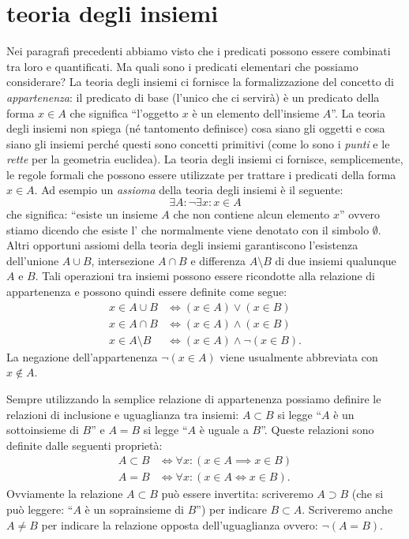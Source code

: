 \section{teoria degli insiemi}
Nei paragrafi precedenti abbiamo visto che i predicati possono essere
combinati tra loro e quantificati.
Ma quali sono i predicati elementari che possiamo considerare?
La teoria degli insiemi ci fornisce la formalizzazione del concetto
di \emph{appartenenza}: il predicato di base (l'unico che ci servirà) è
un predicato della forma $x \in A$ che significa ``l'oggetto $x$ è un elemento
dell'insieme $A$''.
La teoria degli insiemi non spiega (né tantomento definisce)
cosa siano gli oggetti e cosa siano gli insiemi perché questi sono concetti
primitivi (come lo sono i \emph{punti} e le \emph{rette} per la geometria euclidea).
La teoria degli insiemi ci fornisce, semplicemente, le regole formali che
possono essere utilizzate per trattare i predicati della forma $x\in A$.
Ad esempio un \emph{assioma} della teoria degli insiemi è il seguente:
\[
  \exists A \colon \lnot \exists x\colon x \in A
\]
che significa: ``esiste un insieme $A$ che non contiene alcun elemento $x$''
ovvero stiamo dicendo che esiste l' che normalmente viene
denotato con il simbolo $\emptyset$.
Altri opportuni assiomi della teoria degli insiemi garantiscono l'esistenza
dell'unione $A\cup B$, intersezione $A\cap B$ e differenza $A\setminus B$
di due insiemi qualunque $A$ e $B$. Tali operazioni
tra insiemi possono essere ricondotte alla relazione di appartenenza
e possono quindi essere definite come segue:
\begin{align*}
    x \in A \cup B &\iff (x\in A) \lor (x\in B)\\
    x \in A \cap B &\iff (x\in A) \land (x\in B)\\
    x \in A \setminus B &\iff (x\in A) \land \lnot (x \in B).
\end{align*}
La negazione dell'appartenenza $\lnot (x \in A)$ viene usualmente
abbreviata con $x \not \in A$.

Sempre utilizzando la semplice relazione di appartenenza possiamo definire
le relazioni di inclusione e uguaglianza tra insiemi:
$A \subset B$ si legge ``$A$ è un sottoinsieme di $B$''
e $A=B$ si legge ``$A$ è uguale a $B$''. Queste relazioni sono
definite dalle seguenti proprietà:
\begin{align*}
  A \subset B &\iff \forall x\colon (x\in A \implies x\in B)\\
  A = B &\iff \forall x\colon (x\in A \iff x \in B).
\end{align*}
Ovviamente la relazione $A \subset B$ può essere invertita: scriveremo
$A\supset B$ (che si può leggere: ``$A$ è un soprainsieme di $B$'')
per indicare $B \subset A$. Scriveremo anche $A \neq B$ per indicare
la relazione opposta dell'uguaglianza ovvero: $\lnot(A=B)$.

